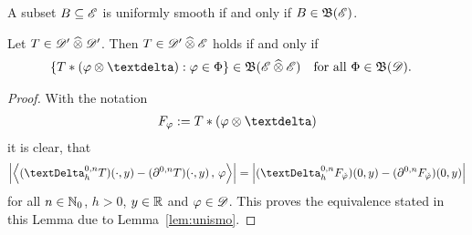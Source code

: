 \begin{lemma}
    \label{lem:unismo}
    A subset $ B \subseteq \mathscr{  E  } $ is uniformly smooth
    if and only if $ B \in \operatorname{\mathfrak{ B }}(\mathscr{  E  }) $.
\end{lemma}

\begin{lemma}
    Let $ T \in \mathscr{  D  }' \mathbin{\widehat{\otimes}} \mathscr{  D  }' $.
    Then $ T \in \mathscr{  D  }' \mathbin{\widehat{\otimes}} \mathscr{  E  } $ holds if and only if
    \begin{align}
        \brmSet{ T * ( \ph \tepro \sfdeo ) }{ \ph \in \Ph }
        \in
        \ssBnd( \fsSmo \ctepro \fsSmo )
        &&&\text{for all $ \Ph \in \ssBnd(\fsTest) $.}
    \end{align}
\end{lemma}

\begin{proof}
    With the notation
    \begin{align}
        F_\ph
        :=
        T * ( \ph \tepro \sfdeo )
    \end{align}
    it is clear, that
    \begin{align}
        \Abs{ \Ska{ ( \tDe^{0,n}_h T )( \cdot, y )  -
        ( \partial^{0,n}T )( \cdot, y ) }{ \ph } }
        =
        \Abs{ ( \tDe^{0,n}_h F_{\refl{\ph}} )(0,y)  -
        ( \partial^{0,n} F_{\refl{\ph}} )(0,y) }
    \end{align}
    for all $ n \in \mathbb{ N }_0 $, $ h > 0 $, $ y \in \mathbb{ R } $ and $ \varphi \in \mathscr{  D  } $.
    This proves the equivalence stated in this Lemma
    due to Lemma~\ref{lem:unismo}.
\end{proof}

